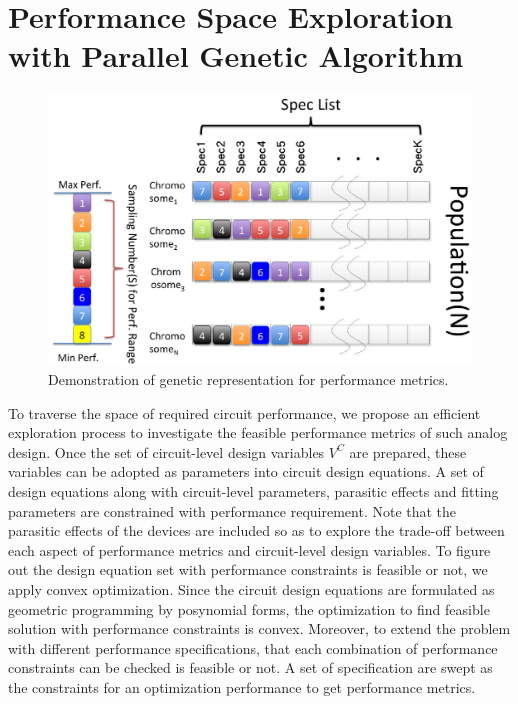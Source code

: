 
  \section{Performance Space Exploration with Parallel Genetic Algorithm}\label{sec:pga}

    
    \begin{figure}[t]
      \centering
      \includegraphics[width=\textwidth]{Fig/Chapter2/Gene.eps}
      \caption{Demonstration of genetic representation for performance metrics.} 
      \label{fig:Gene}
    \end{figure}

    To traverse the space of required circuit performance, we propose an efficient exploration process to investigate the feasible performance metrics of such analog design. Once the set of circuit-level design variables $V^C$ are prepared, these variables can be adopted as parameters into circuit design equations. A set of design equations along with circuit-level parameters, parasitic effects and fitting parameters are constrained with performance requirement. Note that the parasitic effects of the devices are included so as to explore the trade-off between each aspect of performance metrics and circuit-level design variables. To figure out the design equation set with performance constraints is feasible or not, we apply convex optimization. Since the circuit design equations are formulated as geometric programming by posynomial forms, the optimization to find feasible solution with performance constraints is convex. Moreover, to extend the problem with different performance specifications, that each combination of performance constraints can be checked is feasible or not. A set of specification are swept as the constraints for an optimization performance to get performance metrics.
 
